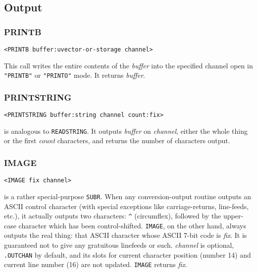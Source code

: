 \documentclass[a4paper]{scrbook}
\begin{document}
\subsection{Output}\label{output-1}

\subsubsection{PRINTB}\label{printb}

\begin{verbatim}
<PRINTB buffer:uvector-or-storage channel>
\end{verbatim}

 This call writes the entire contents of the \emph{buffer} into the specified channel open in
\texttt{"PRINTB"} or \texttt{"PRINTO"} mode. It returns \emph{buffer}.

\subsubsection{PRINTSTRING}\label{printstring}

\begin{verbatim}
<PRINTSTRING buffer:string channel count:fix>
\end{verbatim}

 is analogous to \texttt{READSTRING}. It outputs \emph{buffer} on \emph{channel}, either
the whole thing or the first \emph{count} characters, and returns the number of characters output.

\subsubsection{IMAGE}\label{image}

\begin{verbatim}
<IMAGE fix channel>
\end{verbatim}

 is a rather special-purpose \texttt{SUBR}. When any conversion-output routine outputs an
ASCII control character (with special exceptions like carriage-returns, line-feeds, etc.), it actually outputs two
characters: \texttt{\^{}}  (circumflex), followed by the upper-case character which has been
control-shifted. \texttt{IMAGE}, on the other hand, always outputs the real thing: that ASCII character whose ASCII 7-bit
code is \emph{fix}. It is guaranteed not to give any gratuitous linefeeds or such. \emph{channel} is optional,
\texttt{.OUTCHAN} by default, and its slots for current character position (number 14) and current line number (16) are not
updated. \texttt{IMAGE} returns \emph{fix}.
\end{document}
